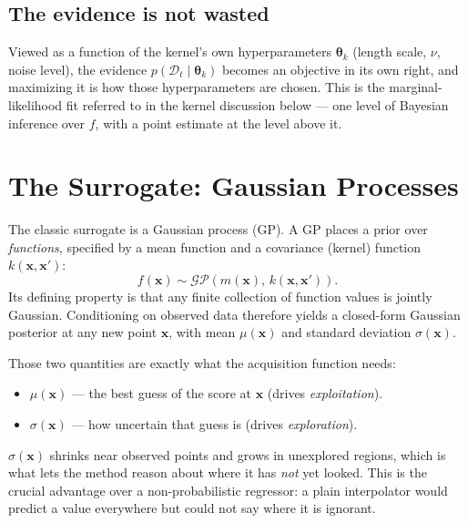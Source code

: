 \documentclass[conference]{IEEEtran}
\begin{document}
\subsection*{The evidence is not wasted}
Viewed as a function of the kernel's own hyperparameters $\boldsymbol{\theta}_k$ (length scale, $\nu$, noise level), the evidence $p(\mathcal{D}_t \mid \boldsymbol{\theta}_k)$ becomes an objective in its own right, and maximizing it is how those hyperparameters are chosen. This is the marginal-likelihood fit referred to in the kernel discussion below --- one level of Bayesian inference over $f$, with a point estimate at the level above it.

\section*{The Surrogate: Gaussian Processes}
The classic surrogate is a Gaussian process (GP). A GP places a prior over \textit{functions}, specified by a mean function and a covariance (kernel) function $k(\mathbf{x}, \mathbf{x}')$:
\begin{equation}
    f(\mathbf{x}) \sim \mathcal{GP}\!\left(m(\mathbf{x}),\, k(\mathbf{x}, \mathbf{x}')\right).
\end{equation}
Its defining property is that any finite collection of function values is jointly Gaussian. Conditioning on observed data therefore yields a closed-form Gaussian posterior at any new point $\mathbf{x}$, with mean $\mu(\mathbf{x})$ and standard deviation $\sigma(\mathbf{x})$.

Those two quantities are exactly what the acquisition function needs:
\begin{itemize}
    \item $\mu(\mathbf{x})$ --- the best guess of the score at $\mathbf{x}$ (drives \textit{exploitation}).
    \item $\sigma(\mathbf{x})$ --- how uncertain that guess is (drives \textit{exploration}).
\end{itemize}
$\sigma(\mathbf{x})$ shrinks near observed points and grows in unexplored regions, which is what lets the method reason about where it has \textit{not} yet looked. This is the crucial advantage over a non-probabilistic regressor: a plain interpolator would predict a value everywhere but could not say where it is ignorant.
\end{document}
